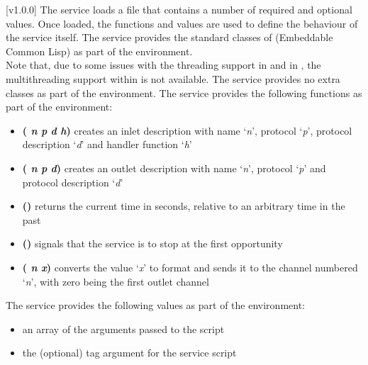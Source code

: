 [v1.0.0]
The \CLF{} service loads a \CL{} file that contains a number of required and optional
values.
Once loaded, the \CL{} functions and values are used to define the behaviour of the
service itself.
The \CLF{} service provides the standard classes of \ECL{} (Embeddable Common Lisp) as part
of the \CL{} environment.\\

Note that, due to some issues with the threading support in \ECL{} and in \yarp{}, the
multithreading support within \ECL{} is not available.
\secondaryEnd
{}
The \CLF{} service provides no extra classes as part of the \CL{} environment.
\secondaryEnd
{}
The \CLF{} service provides the following functions as part of the \CL{} environment:
\begin{itemize}
\item\textbf{( \textit{n} \textit{p} \textit{d} \textit{h})}
\longDash{} creates an inlet description with name `\textit{n}', protocol `\textit{p}',
protocol description `\textit{d}' and handler function `\textit{h}'
\item\exSp\textbf{( \textit{n} \textit{p} \textit{d})}
\longDash{} creates an outlet description with name `\textit{n}', protocol `\textit{p}'
and protocol description `\textit{d}'
\item\exSp\textbf{()} \longDash{} returns the current time in seconds, relative
to an arbitrary time in the past
\item\exSp\textbf{()} \longDash{} signals that the service is to stop
at the first opportunity
\item\exSp\textbf{( \textit{n} \textit{x})} \longDash{} converts the
value `\textit{x}' to \yarp{} format and sends it to the channel numbered `\textit{n}',
with zero being the first outlet channel
\end{itemize}
\secondaryEnd
{}
The \CLF{} service provides the following values as part of the \CL{} environment:
\begin{itemize}
\item\textbf{} \longDash{} an array of the arguments passed to the
script
\item\exSp\textbf{} \longDash{} the (optional) tag argument for the service
script
\end{itemize}
